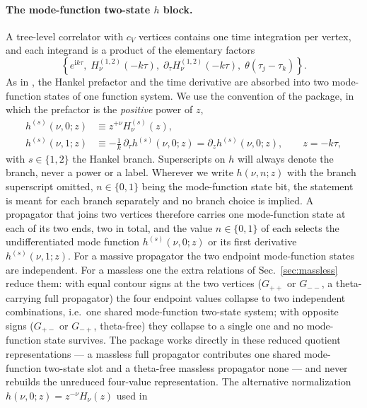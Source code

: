\documentclass[11pt,a4paper]{article}
\newcommand{\ii}{\mathrm i}
\begin{document}
\paragraph{The mode-function two-state $h$ block.}
A tree-level correlator with $c_V$ vertices contains one time integration per vertex, and each
integrand is a product of the elementary factors
\begin{equation}
  \left\{e^{\ii k\tau},\;H^{(1,2)}_\nu(-k\tau),\;
  \partial_\tau H^{(1,2)}_\nu(-k\tau),\;\theta(\tau_j-\tau_k)\right\}.
  \label{eq:integrand-factors}
\end{equation}
As in \cite{Chen:2024glu}, the Hankel prefactor and the time derivative are absorbed into two
mode-function states of one function system. We use the convention of the package, in which the prefactor is the
\emph{positive} power of $z$,
\begin{equation}
  \begin{aligned}
  h^{(s)}(\nu,0;z)&\equiv z^{+\nu}H^{(s)}_\nu(z),\\
  h^{(s)}(\nu,1;z)&\equiv-\frac1k\,\partial_\tau h^{(s)}(\nu,0;z)=\partial_z h^{(s)}(\nu,0;z),
  \qquad z=-k\tau,
  \end{aligned}
  \label{eq:h-definition}
\end{equation}
with $s\in\{1,2\}$ the Hankel branch. Superscripts on $h$ will always denote the branch, never a
power or a label. Wherever we write $h(\nu,n;z)$ with the branch superscript omitted, $n\in\{0,1\}$
being the mode-function state bit, the statement is meant for each branch separately and no branch choice is
implied. A propagator that joins two vertices therefore carries one mode-function state at each of
its two ends, two in total, and the value $n\in\{0,1\}$ of each selects the undifferentiated mode
function $h^{(s)}(\nu,0;z)$ or its first derivative $h^{(s)}(\nu,1;z)$. For a massive propagator the
two endpoint mode-function states are independent. For a massless one the extra relations of
Sec.~\ref{sec:massless} reduce them: with equal contour signs at the two vertices ($G_{++}$ or
$G_{--}$, a theta-carrying full propagator) the four endpoint values collapse to two independent
combinations, i.e.\ one shared mode-function two-state system; with opposite signs ($G_{+-}$ or
$G_{-+}$, theta-free) they collapse to a single one and no mode-function state survives. The
package works directly in these reduced quotient representations --- a massless full propagator
contributes one shared mode-function two-state slot and a theta-free massless propagator none --- and
never rebuilds the unreduced four-value representation. The alternative normalization $h(\nu,0;z)=z^{-\nu}H_\nu(z)$ used in
\end{document}
